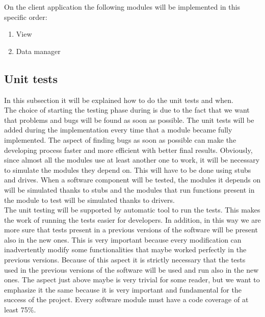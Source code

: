 \documentclass[titlepage]{article}
\begin{document}
On the client application the following modules will be implemented in this specific order:
\begin{enumerate}
	\item View
	\item Data manager
\end{enumerate}


\subsection{Unit tests}
In this subsection it will be explained how to do the unit tests and when.\\
The choice of starting the testing phase during is due to the fact that we want that problems and bugs will be found as soon as possible. The unit tests will be added during the implementation every time that a module became fully implemented. The aspect of finding bugs as soon as possible can make the developing process faster and more efficient with better final results. Obviously, since almost all the modules use at least another one to work, it will be necessary to simulate the modules they depend on. This will have to be done using stubs and drives. When a software component will be tested, the modules it depends on will be simulated thanks to stubs and the modules that run functions present in the module to test will be simulated thanks to drivers.\\
The unit testing will be supported by automatic tool to run the tests. This makes the work of running the tests easier for developers. In addition, in this way we are more sure that tests present in a previous versions of the software will be present also in the  new ones. This is very important because every modification can inadvertently modify some functionalities that maybe worked perfectly in the previous versions. Because of this aspect it is strictly necessary that the tests used in the previous versions of the software will be used and run also in the new ones. The aspect just above maybe is very trivial for some reader, but we want to emphasize it the same because it is very important and fundamental for the success of the project. Every software module must have a code coverage of at least 75\%.
\end{document}
